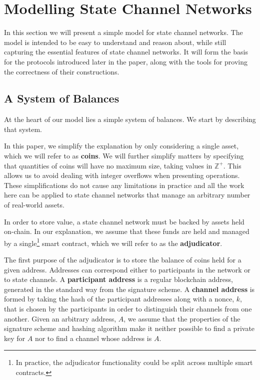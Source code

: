 
\section{Modelling State Channel Networks}

In this section we will present a simple model for state channel networks.
The model is intended to be easy to understand and reason about, while still capturing the essential features of state channel networks.
It will form the basis for the protocols introduced later in the paper, along with the tools for proving the correctness of their constructions.

\subsection{A System of Balances}

At the heart of our model lies a simple system of balances. 
We start by describing that system.

In this paper, we simplify the explanation by only considering a single asset, which we will refer to as \textbf{coins}.
We will further simplify matters by specifying that quantities of coins will have no maximum
size, taking values in $\mathbb{Z}^+$.
This allows us to avoid dealing with integer overflows when presenting operations.
These simplifications do not cause any limitations in practice and all the work
here can be applied to state channel networks that manage an arbitrary number of 
real-world assets.

In order to store value, a state channel network must be backed by assets held on-chain.
In our explanation, we assume that these funds are held and managed by a single\footnote{
In practice, the adjudicator functionality could be split across multiple smart contracts.
} smart contract,
which we will refer to as the \textbf{adjudicator}.

The first purpose of the adjudicator is to store the balance of coins held for a given address.
Addresses can correspond either to participants in the network or to state channels.
A \textbf{participant address} is a regular blockchain address, generated in the standard way from the signature scheme.
A \textbf{channel address} is formed by taking the hash of the participant addresses along with a nonce, $k$, that is chosen by the participants in order to distinguish their channels from one another.
Given an arbitrary address, $A$, we assume that the properties of the signature scheme and hashing algorithm make it neither possible to find a private key for $A$ nor to find a channel whose address is $A$.

